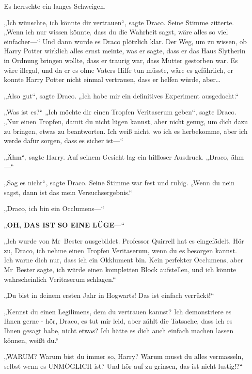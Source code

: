 {Es herrschte ein langes Schweigen.

„Ich wünschte, ich könnte dir vertrauen“, sagte Draco. Seine Stimme zitterte. „Wenn ich nur wissen könnte, dass du die Wahrheit sagst, wäre alles so viel einfacher—“ Und dann wurde es Draco plötzlich klar. Der Weg, um zu wissen, ob Harry Potter wirklich alles ernst meinte, was er sagte, dass er das Haus Slytherin in Ordnung bringen wollte, dass er traurig war, dass Mutter gestorben war. Es wäre illegal, und da er es ohne Vaters Hilfe tun müsste, wäre es gefährlich, er konnte Harry Potter nicht einmal vertrauen, dass er helfen würde, aber…

„Also gut“, sagte Draco. „Ich habe mir ein definitives Experiment ausgedacht.“

„Was ist es?“ „Ich möchte dir einen Tropfen Veritaserum geben“, sagte Draco. „Nur einen Tropfen, damit du nicht lügen kannst, aber nicht genug, um dich dazu zu bringen, etwas zu beantworten. Ich weiß nicht, wo ich es herbekomme, aber ich werde dafür sorgen, dass es sicher ist—“

„Ähm“, sagte Harry. Auf seinem Gesicht lag ein hilfloser Ausdruck. „Draco, ähm—“

„Sag es nicht“, sagte Draco. Seine Stimme war fest und ruhig. „Wenn du nein sagst, dann ist das mein Versuchsergebnis.“

„Draco, ich bin ein Occlumens—“

„\textbf{OH, DAS IST SO EINE LÜGE}—“

„Ich wurde von Mr~Bester ausgebildet. Professor Quirrell hat es eingefädelt. Hör zu, Draco, ich nehme einen Tropfen Veritaserum, wenn du es besorgen kannst. Ich warne dich nur, dass ich ein Okklument bin. Kein perfekter Occlumens, aber Mr~Bester sagte, ich würde einen kompletten Block aufstellen, und ich könnte wahrscheinlich Veritaserum schlagen.“

„Du bist in deinem ersten Jahr in Hogwarts! Das ist einfach verrückt!“

„Kennst du einen Legilimens, dem du vertrauen kannst? Ich demonstriere es Ihnen gerne - hör, Draco, es tut mir leid, aber zählt die Tatsache, dass ich es Ihnen gesagt habe, nicht etwas? Ich hätte es dich auch einfach machen lassen können, weißt du.“

„WARUM? Warum bist du immer so, Harry? Warum musst du alles vermasseln, selbst wenn es UNMÖGLICH ist? Und hör auf zu grinsen, das ist nicht lustig!?“

}
